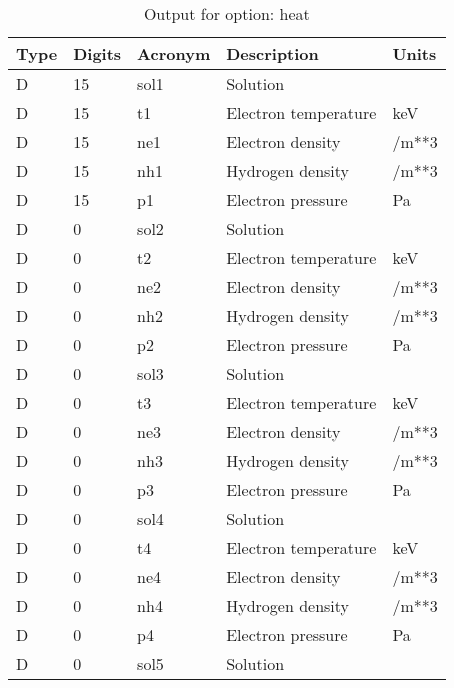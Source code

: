 \begin{table}[!p]
\caption{Output for option: heat}
\label{tabout:heat}
\begin{tabular}{lllll}
\hline
Type & Digits & Acronym & Description & Units \\ 
\hline
D & 15 & sol1 & Solution                         &                  \\
D & 15 & t1   & Electron temperature             & keV              \\
D & 15 & ne1  & Electron density                 & /m**3            \\
D & 15 & nh1  & Hydrogen density                 & /m**3            \\
D & 15 & p1   & Electron pressure                & Pa               \\
D &  0 & sol2 & Solution                         &                  \\
D &  0 & t2   & Electron temperature             & keV              \\
D &  0 & ne2  & Electron density                 & /m**3            \\
D &  0 & nh2  & Hydrogen density                 & /m**3            \\
D &  0 & p2   & Electron pressure                & Pa               \\
D &  0 & sol3 & Solution                         &                  \\
D &  0 & t3   & Electron temperature             & keV              \\
D &  0 & ne3  & Electron density                 & /m**3            \\
D &  0 & nh3  & Hydrogen density                 & /m**3            \\
D &  0 & p3   & Electron pressure                & Pa               \\
D &  0 & sol4 & Solution                         &                  \\
D &  0 & t4   & Electron temperature             & keV              \\
D &  0 & ne4  & Electron density                 & /m**3            \\
D &  0 & nh4  & Hydrogen density                 & /m**3            \\
D &  0 & p4   & Electron pressure                & Pa               \\
D &  0 & sol5 & Solution                         &                  \\

\end{tabular}
\end{table}
